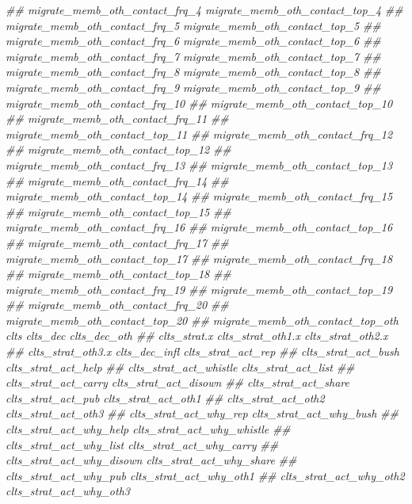 \documentclass[
]{article}
\newenvironment{Shaded}{\begin{snugshade}}{\end{snugshade}}
\newcommand{\CommentTok}[1]{\textcolor[rgb]{0.56,0.35,0.01}{\textit{#1}}}
\begin{document}
\begin{Shaded}
\begin{Highlighting}[]
\CommentTok{##      migrate_memb_oth_contact_frq_4 migrate_memb_oth_contact_top_4}
\CommentTok{##      migrate_memb_oth_contact_frq_5 migrate_memb_oth_contact_top_5}
\CommentTok{##      migrate_memb_oth_contact_frq_6 migrate_memb_oth_contact_top_6}
\CommentTok{##      migrate_memb_oth_contact_frq_7 migrate_memb_oth_contact_top_7}
\CommentTok{##      migrate_memb_oth_contact_frq_8 migrate_memb_oth_contact_top_8}
\CommentTok{##      migrate_memb_oth_contact_frq_9 migrate_memb_oth_contact_top_9}
\CommentTok{##      migrate_memb_oth_contact_frq_10}
\CommentTok{##      migrate_memb_oth_contact_top_10}
\CommentTok{##      migrate_memb_oth_contact_frq_11}
\CommentTok{##      migrate_memb_oth_contact_top_11}
\CommentTok{##      migrate_memb_oth_contact_frq_12}
\CommentTok{##      migrate_memb_oth_contact_top_12}
\CommentTok{##      migrate_memb_oth_contact_frq_13}
\CommentTok{##      migrate_memb_oth_contact_top_13}
\CommentTok{##      migrate_memb_oth_contact_frq_14}
\CommentTok{##      migrate_memb_oth_contact_top_14}
\CommentTok{##      migrate_memb_oth_contact_frq_15}
\CommentTok{##      migrate_memb_oth_contact_top_15}
\CommentTok{##      migrate_memb_oth_contact_frq_16}
\CommentTok{##      migrate_memb_oth_contact_top_16}
\CommentTok{##      migrate_memb_oth_contact_frq_17}
\CommentTok{##      migrate_memb_oth_contact_top_17}
\CommentTok{##      migrate_memb_oth_contact_frq_18}
\CommentTok{##      migrate_memb_oth_contact_top_18}
\CommentTok{##      migrate_memb_oth_contact_frq_19}
\CommentTok{##      migrate_memb_oth_contact_top_19}
\CommentTok{##      migrate_memb_oth_contact_frq_20}
\CommentTok{##      migrate_memb_oth_contact_top_20}
\CommentTok{##      migrate_memb_oth_contact_top_oth clts clts_dec clts_dec_oth}
\CommentTok{##      clts_strat.x clts_strat_oth1.x clts_strat_oth2.x}
\CommentTok{##      clts_strat_oth3.x clts_dec_infl clts_strat_act_rep}
\CommentTok{##      clts_strat_act_bush clts_strat_act_help}
\CommentTok{##      clts_strat_act_whistle clts_strat_act_list}
\CommentTok{##      clts_strat_act_carry clts_strat_act_disown}
\CommentTok{##      clts_strat_act_share clts_strat_act_pub clts_strat_act_oth1}
\CommentTok{##      clts_strat_act_oth2 clts_strat_act_oth3}
\CommentTok{##      clts_strat_act_why_rep clts_strat_act_why_bush}
\CommentTok{##      clts_strat_act_why_help clts_strat_act_why_whistle}
\CommentTok{##      clts_strat_act_why_list clts_strat_act_why_carry}
\CommentTok{##      clts_strat_act_why_disown clts_strat_act_why_share}
\CommentTok{##      clts_strat_act_why_pub clts_strat_act_why_oth1}
\CommentTok{##      clts_strat_act_why_oth2 clts_strat_act_why_oth3}

\end{Highlighting}
\end{Shaded}
\end{document}
